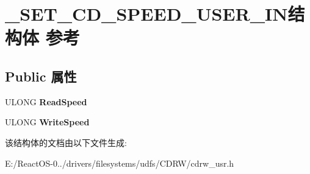 \hypertarget{struct___s_e_t___c_d___s_p_e_e_d___u_s_e_r___i_n}{}\section{\+\_\+\+S\+E\+T\+\_\+\+C\+D\+\_\+\+S\+P\+E\+E\+D\+\_\+\+U\+S\+E\+R\+\_\+\+I\+N结构体 参考}
\label{struct___s_e_t___c_d___s_p_e_e_d___u_s_e_r___i_n}
\subsection*{Public 属性}
\begin{DoxyCompactItemize}
\item 
\mbox{\label{struct___s_e_t___c_d___s_p_e_e_d___u_s_e_r___i_n_a9dbde8633948d359f5ce2834abda4879}} 
U\+L\+O\+NG {\bfseries Read\+Speed}
\item 
\mbox{\label{struct___s_e_t___c_d___s_p_e_e_d___u_s_e_r___i_n_a2a95a7b074d37e0fcc327613a3cbfb6d}} 
U\+L\+O\+NG {\bfseries Write\+Speed}
\end{DoxyCompactItemize}


该结构体的文档由以下文件生成\+:\begin{DoxyCompactItemize}
\item 
E\+:/\+React\+O\+S-\/0../drivers/filesystems/udfs/\+C\+D\+R\+W/cdrw\+\_\+usr.\+h\end{DoxyCompactItemize}
